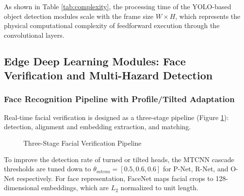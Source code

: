 \documentclass[12pt,a4paper]{article}
\begin{document}
As shown in Table \ref{tab:complexity}, the processing time of the YOLO-based object detection modules scale with the frame size $W \times H$, which represents the physical computational complexity of feedforward execution through the convolutional layers.


\subsection{Edge Deep Learning Modules: Face Verification and Multi-Hazard Detection}

\subsubsection*{Face Recognition Pipeline with Profile/Tilted Adaptation}
Real-time facial verification is designed as a three-stage pipeline (Figure \ref{fig:face_pipeline}): detection, alignment and embedding extraction, and matching.

\begin{figure}[h]
    \centering
    \caption{Three-Stage Facial Verification Pipeline}
    \label{fig:face_pipeline}
\end{figure}

To improve the detection rate of turned or tilted heads, the MTCNN cascade thresholds are tuned down to $\theta_{mtcnn} = [0.5, 0.6, 0.6]$ for P-Net, R-Net, and O-Net respectively. For face representation, FaceNet maps facial crops to 128-dimensional embeddings, which are $L_2$ normalized to unit length. 
\end{document}
